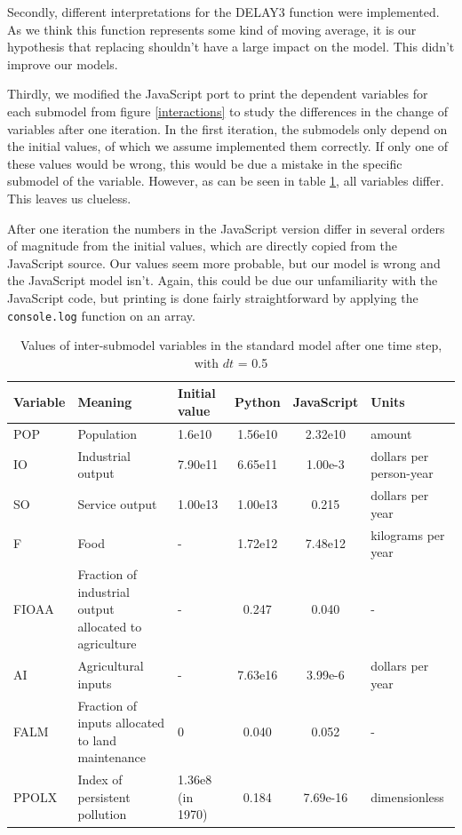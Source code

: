 \documentclass[10pt,a4paper]{scrartcl}
\begin{document}
Secondly, different interpretations for the DELAY3 function were implemented. As we think this function represents some kind of moving average, it is our hypothesis that replacing shouldn't have a large impact on the model. This didn't improve our models.

Thirdly, we modified the JavaScript port \cite{blogpost} to print the dependent variables for each submodel from figure \ref{interactions} to study the differences in the change of variables after one iteration. In the first iteration, the submodels only depend on the initial values, of which we assume implemented them correctly. If only one of these values would be wrong, this would be due a mistake in the specific submodel of the variable. However, as can be seen in table \ref{value-differences}, all variables differ. This leaves us clueless.

After one iteration the numbers in the JavaScript version differ in several orders of magnitude from the initial values, which are directly copied from the JavaScript source. Our values seem more probable, but our model is wrong and the JavaScript model isn't. Again, this could be due our unfamiliarity with the JavaScript code, but printing is done fairly straightforward by applying the \texttt{console.log} function on an array.

\begin{table}
\centering
\begin{longtable}{|m{1.3cm}|m{3cm}|m{1.4cm}|c|c|m{2cm}|}
\hline
\textbf{Variable} & \textbf{Meaning} & \textbf{Initial value} & \textbf{Python} & \textbf{JavaScript} & \textbf{Units}\\
\hline
POP & Population & 1.6e10 & 1.56e10 & 2.32e10 & amount\\
\hline
IO & Industrial output & 7.90e11 & 6.65e11 & 1.00e-3 & dollars per person-year\\
\hline
SO & Service output & 1.00e13 & 1.00e13 & 0.215 & dollars per year\\
\hline
F & Food & - & 1.72e12 & 7.48e12 & kilograms per year\\
\hline
FIOAA & Fraction of industrial output allocated to agriculture & - & 0.247 & 0.040 & -\\
\hline
AI & Agricultural inputs & - & 7.63e16 & 3.99e-6 & dollars per year\\
\hline
FALM & Fraction of inputs allocated to land maintenance & 0 & 0.040 & 0.052 & -\\
\hline
PPOLX & Index of persistent pollution & 1.36e8 (in 1970) & 0.184 & 7.69e-16 & dimensionless\\
\hline
\end{longtable}
\caption{Values of inter-submodel variables in the standard model after one time step, with $dt$ = 0.5}
\label{value-differences}
\end{table}
\end{document}
